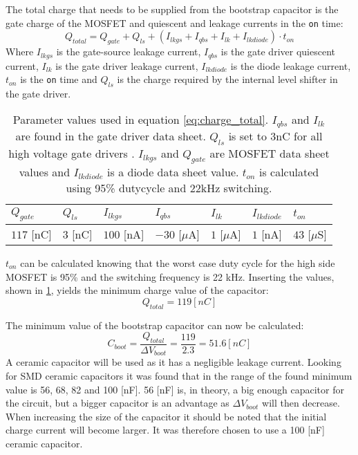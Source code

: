 The total charge that needs to be supplied from the bootstrap capacitor is the gate charge of the MOSFET and quiescent and leakage currents in the \texttt{on} time:
\begin{equation}
	Q_{total} = Q_{gate} + Q_{ls} + (I_{lkgs} + I_{qbs} + I_{lk} + I_{lkdiode}) \cdot t_{on}
	\label{eq:charge_total}
\end{equation}
Where $I_{lkgs}$ is the gate-source leakage current, $I_{qbs}$ is the gate driver quiescent current, $I_{lk}$ is the gate driver leakage current, $I_{lkdiode}$ is the diode leakage current, $ t_{on}$ is the \texttt{on} time and $Q_{ls}$ is the charge required by the internal level shifter in the gate driver.
\begin{table}[h]
\centering
\begin{tabular}{|l|l|l|l|l|l|l|}
 \hline
 $Q_{gate}$ 	& $Q_{ls}$ 	& $I_{lkgs}$ 	& $I_{qbs}$ 		& $I_{lk}$ 			& $I_{lkdiode}$ 	& $t_{on}$ 		\\ 	\hline
 $117$ [nC]		& $3$ [nC]	& $100$ [nA]	&$-30$ [$\mu$A]		& $1$ [$\mu$A]		& $1$ [nA]			& $43$ [$\mu$S]	\\ 	\hline
\end{tabular}
\caption{Parameter values used in equation \ref{eq:charge_total}. $I_{qbs}$ and $I_{lk}$ are found in the gate driver data sheet. $Q_{ls}$ is set to 3nC for all high voltage gate drivers \cite{bootstrap_ON}. $I_{lkgs}$ and $Q_{gate}$ are MOSFET data sheet values and $I_{lkdiode}$  is a diode data sheet value. $t_{on}$ is calculated using 95\% dutycycle and 22kHz switching.}
\label{tab:bootstrap_parameter}
\end{table}
$t_{on}$ can be calculated knowing that the worst case duty cycle for the high side MOSFET is 95\% and the switching frequency is 22 kHz.
Inserting the values, shown in \ref{tab:bootstrap_parameter}, yields the minimum charge value of the capacitor:
\begin{equation}
	Q_{total} = 119 [nC]
\end{equation}

The minimum value of the bootstrap capacitor can now be calculated:
\begin{equation}
	C_{boot} = \frac{Q_{total}}{\Delta V_{boot}} = \frac{119}{2.3} = 51.6 [nC]
\end{equation}
A ceramic capacitor will be used as it has a negligible leakage current. 
Looking for SMD ceramic capacitors it was found that in the range of the found minimum value is 56, 68, 82 and 100 [nF].
56 [nF] is, in theory, a big enough capacitor for the circuit, but a bigger capacitor is an advantage as $\Delta V_{boot}$ will then decrease.
When increasing the size of the capacitor it should be noted that the initial charge current will become larger.
It was therefore chosen to use a 100 [nF] ceramic capacitor.

